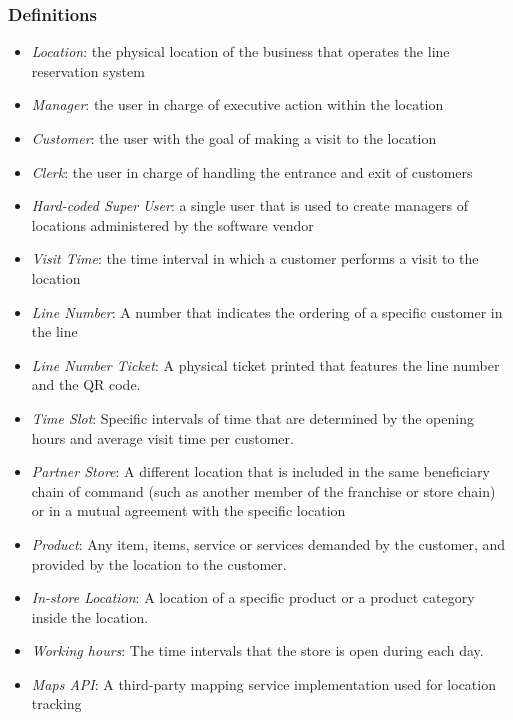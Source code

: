 \subsubsection{Definitions}
\begin{itemize}
    \item \textit{Location}: the physical location of the business that operates the line reservation system
    \item \textit{Manager}: the user in charge of executive action within the location
    \item \textit{Customer}: the user with the goal of making a visit to the location
    \item \textit{Clerk}: the user in charge of handling the entrance and exit of customers
    \item \textit{Hard-coded Super User}: a single user that is used to create managers of locations administered by the software vendor
    \item \textit{Visit Time}: the time interval in which a customer performs a visit to the location
    \item \textit{Line Number}: A number that indicates the ordering of a specific customer in the line
    \item \textit{Line Number Ticket}: A physical ticket printed that features the line number and the QR code.
    \item \textit{Time Slot}: Specific intervals of time that are determined by the opening hours and average visit time per customer.
    \item \textit{Partner Store}: A different location that is included in the same beneficiary chain of command (such as another member of the franchise or store chain) or in a mutual agreement with the specific location
    \item \textit{Product}: Any item, items, service or services demanded by the customer, and provided by the location to the customer.
    \item \textit{In-store Location}: A location of a specific product or a product category inside the location.
    \item \textit{Working hours}: The time intervals that the store is open during each day.
    \item \textit{Maps API}: A third-party mapping service implementation used for location tracking
\end{itemize}

